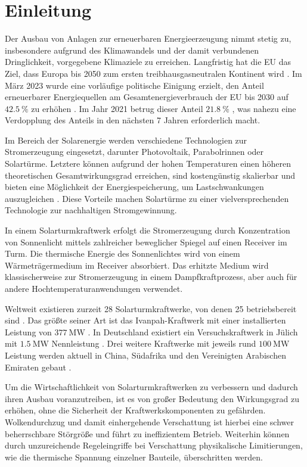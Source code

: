 \chapter{Einleitung} \label{ch_Einleitung}
Der Ausbau von Anlagen zur erneuerbaren Energieerzeugung nimmt stetig zu, insbesondere aufgrund des Klimawandels und der damit verbundenen Dringlichkeit, vorgegebene Klimaziele zu erreichen.
Langfristig hat die EU das Ziel, dass Europa bis 2050 zum ersten treibhausgasneutralen Kontinent wird \cite{Umweltbundesamt}.
Im März 2023 wurde eine vorläufige politische Einigung erzielt, den Anteil erneuerbarer Energiequellen am Gesamtenergieverbrauch der EU bis 2030 auf $\SI{42.5}{\percent}$ zu erhöhen \cite{RatEU}.
Im Jahr 2021 betrug dieser Anteil $\SI{21.8}{\percent}$ \cite{Destatis}, was nahezu eine Verdopplung des Anteils in den nächsten 7 Jahren erforderlich macht.

Im Bereich der Solarenergie werden verschiedene Technologien zur Stromerzeugung eingesetzt, darunter Photovoltaik, Parabolrinnen oder Solartürme.
Letztere können aufgrund der hohen Temperaturen einen höheren theoretischen Gesamtwirkungsgrad erreichen, sind kostengünstig skalierbar und bieten eine Möglichkeit der Energiespeicherung, um Lastschwankungen auszugleichen \cite{Breeze}.
Diese Vorteile machen Solartürme zu einer vielversprechenden Technologie zur nachhaltigen Stromgewinnung.

In einem Solarturmkraftwerk erfolgt die Stromerzeugung durch Konzentration von Sonnenlicht mittels zahlreicher beweglicher Spiegel auf einen Receiver im Turm.
Die thermische Energie des Sonnenlichtes wird von einem Wärmeträgermedium im Receiver absorbiert.
Das erhitzte Medium wird klassischerweise zur Stromerzeugung in einem Dampfkraftprozess, aber auch für andere Hochtemperaturanwendungen verwendet.

Weltweit existieren zurzeit 28 Solarturmkraftwerke, von denen 25 betriebsbereit sind \cite{NREL1}.
Das größte seiner Art ist das Ivanpah-Kraftwerk mit einer installierten Leistung von $\SI{377}{\mega\watt}$ \cite{NREL2}.
In Deutschland existiert ein Versuchskraftwerk in Jülich mit $\SI{1.5}{\mega\watt}$ Nennleistung \cite{NREL3}.
Drei weitere Kraftwerke mit jeweils rund $\SI{100}{\mega\watt}$ Leistung werden aktuell in China, Südafrika und den Vereinigten Arabischen Emiraten gebaut \cite{NREL4}.

Um die Wirtschaftlichkeit von Solarturmkraftwerken zu verbessern und dadurch ihren Ausbau voranzutreiben, ist es von großer Bedeutung den Wirkungsgrad zu erhöhen, ohne die Sicherheit der Kraftwerkskomponenten zu gefährden.
Wolkendurchzug und damit einhergehende Verschattung ist hierbei eine schwer beherrschbare Störgröße und führt zu ineffizientem Betrieb.
Weiterhin können durch unzureichende Regeleingriffe bei Verschattung physikalische Limitierungen, wie die thermische Spannung einzelner Bauteile, überschritten werden.

